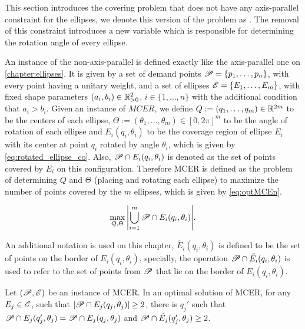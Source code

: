 This section introduces the covering problem that does not have any axis-parallel constraint for the ellipses, we denote this version of the problem as . The removal of this constraint introduces a new variable which is responsible for determining the rotation angle of every ellipse.

An instance of the non-axis-parallel is defined exactly like the axis-parallel one on \autoref{chapter:ellipses}. It is given by a set of demand points $\mathscr{P}=\{p_1, \dots, p_n\}$, with every point having a unitary weight, and a set of ellipses $\mathscr{E}=\{E_1, \dots, E_m\}$, with fixed shape parameters $(a_i, b_i) \in \mathbb{R}^2_{>0}$, $i \in \{1, \dots, n\}$ with the additional condition that $a_i > b_i$. Given an instance of $MCER$, we define $Q:=(q_1, \dots, q_m) \in \mathbb{R}^{2m}$ to be the centers of each ellipse, $\Theta:=(\theta_1, \dots, \theta_m) \in [0, 2\pi]^m$ to be the angle of rotation of each ellipse and $E_i(q_i, \theta_i)$ to be the coverage region of ellipse $E_i$ with its center at point $q_i$ rotated by angle $\theta_i$, which is given by \autoref{eq:rotated_ellipse_co}.
Also, $\mathscr{P} \cap E_i(q_i, \theta_i)$ is denoted as the set of points covered by $E_i$ on this configuration. Therefore MCER is defined as the problem of determining $Q$ and $\Theta$ (placing and rotating each ellipse) to maximize the number of points covered by the $m$ ellipses, which is given by \autoref{eq:optMCEn}.

\begin{equation}\label{eq:optMCEn}
\max_{Q, \Theta}{\left|\bigcup_{i=1}^{m} \mathscr{P} \cap E_i(q_i, \theta_i)\right|}.
\end{equation}

An additional notation is used on this chapter, $\tilde{E_i}(q_i, \theta_i)$ is defined to be the set of points on the border of $E_i(q_i, \theta_i)$, specially, the operation $\mathscr{P} \cap \tilde{E_i}(q_i, \theta_i)$ is used to refer to the set of points from $\mathscr{P}$ that lie on the border of $E_i(q_i, \theta_i)$.


\begin{proposicao}\label{lema:mce_2b}
	Let $(\mathscr{P}, \mathscr{E})$ be an instance of MCER. In an optimal solution of MCER, for any $E_j \in \mathscr{E}$, such that $|\mathscr{P} \cap E_j(q_j, \theta_j)|\ge2$, there is $q_j'$ such that $\mathscr{P} \cap E_j(q_j', \theta_j)=\mathscr{P} \cap E_j(q_j, \theta_j)$ and $\mathscr{P} \cap \tilde{E_j}(q_j', \theta_j) \ge 2$.
\end{proposicao}

